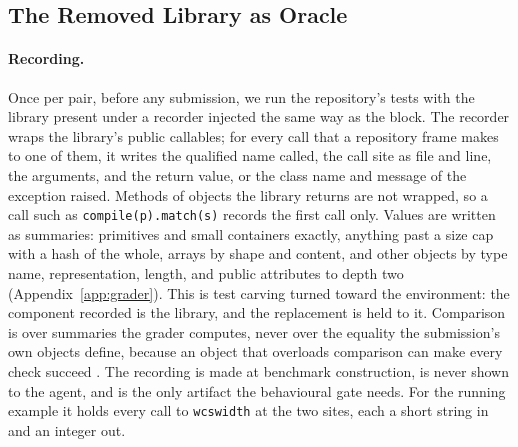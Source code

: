 \documentclass[11pt]{article}
\newcommand{\code}[1]{\texttt{\small #1}}
\begin{document}
\subsection{The Removed Library as Oracle}
\label{sec:behaviour}

\paragraph{Recording.}
Once per pair, before any submission, we run the repository's tests with the library present under a recorder injected the same way as the block.
The recorder wraps the library's public callables; for every call that a repository frame makes to one of them, it writes the qualified name called, the call site as file and line, the arguments, and the return value, or the class name and message of the exception raised.
Methods of objects the library returns are not wrapped, so a call such as \code{compile(p).match(s)} records the first call only.
Values are written as summaries: primitives and small containers exactly, anything past a size cap with a hash of the whole, arrays by shape and content, and other objects by type name, representation, length, and public attributes to depth two (Appendix~\ref{app:grader}).
This is test carving \citep{elbaum2009carving,saff2005factoring} turned toward the environment: the component recorded is the library, and the replacement is held to it.
Comparison is over summaries the grader computes, never over the equality the submission's own objects define, because an object that overloads comparison can make every check succeed \citep{zhong2025impossiblebench}.
The recording is made at benchmark construction, is never shown to the agent, and is the only artifact the behavioural gate needs.
For the running example it holds every call to \code{wcswidth} at the two sites, each a short string in and an integer out.
\end{document}
